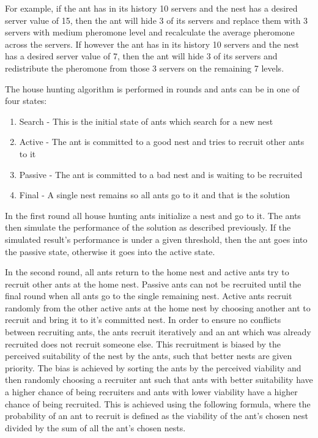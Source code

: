\documentclass[conference]{IEEEtran}
\begin{document}
For example, if the ant has in its history 10 servers and the nest has a desired server value of 15, then the ant will hide 3 of its servers and replace them with 3 servers with medium pheromone level and recalculate the average pheromone across the servers. If however the ant has in its history 10 servers and the nest has a desired server value of 7, then the ant will hide 3 of its servers and redistribute the pheromone from those 3 servers on the remaining 7 levels.

The house hunting algorithm is performed in rounds and ants can be in one of four states:

\begin{enumerate}
	\item Search - This is the initial state of ants which search for a new nest
	\item Active - The ant is committed to a good nest and tries to recruit other ants to it
	\item Passive - The ant is committed to a bad nest and is waiting to be recruited
	\item Final - A single nest remains so all ants go to it and that is the solution
\end{enumerate}

In the first round all house hunting ants initialize a nest and go to it. The ants then simulate the performance of the solution as described previously. If the simulated result's performance is under a given threshold, then the ant goes into the passive state, otherwise it goes into the active state.

In the second round, all ants return to the home nest and active ants try to recruit other ants at the home nest. Passive ants can not be recruited until the final round when all ants go to the single remaining nest. Active ants recruit randomly from the other active ants at the home nest by choosing another ant to recruit and bring it to it's committed nest. In order to ensure no conflicts between recruiting ants, the ants recruit iteratively and an ant which was already recruited does not recruit someone else. This recruitment is biased by the perceived suitability of the nest by the ants, such that better nests are given priority. The bias is achieved by sorting the ants by the perceived viability and then randomly choosing a recruiter ant such that ants with better suitability have a higher chance of being recruiters and ants with lower viability have a higher chance of being recruited. This is achieved using the following formula, where the probability of an ant to recruit is defined as the viability of the ant's chosen nest divided by the sum of all the ant's chosen nests.
\end{document}
